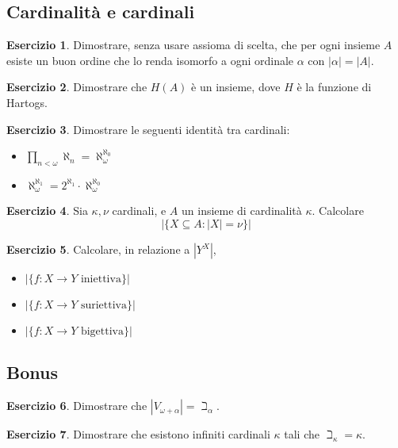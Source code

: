\documentclass[a4paper,10pt,oneside]{article}
\newcommand{\abs}[1]{\left|#1\right|}
\theoremstyle{plain}
\theoremstyle{definition}
\newtheorem{myex}{Esercizio}
\theoremstyle{remark}
\begin{document}
\subsection{Cardinalità e cardinali}
\begin{myex}
 Dimostrare, senza usare assioma di scelta, che per ogni insieme $A$ esiste un buon ordine che lo renda isomorfo a ogni ordinale $\alpha$ con $\abs\alpha=\abs A$.
\end{myex}
\begin{myex}\label{ex:Hart}
 Dimostrare che $H(A)$ è un insieme, dove $H$ è la funzione di Hartogs.
\end{myex}
\begin{myex}
 Dimostrare le seguenti identità tra cardinali:
 \begin{itemize}
  \item $\prod_{n<\omega}\aleph_n=\aleph_\omega^{\aleph_0}$
  \item $\aleph_\omega^{\aleph_1}=2^{\aleph_1}\cdot \aleph_\omega^{\aleph_0}$
 \end{itemize}
\end{myex}
\begin{myex}
 Sia $\kappa, \nu$ cardinali, e $A$ un insieme di cardinalità $\kappa$. Calcolare \[\abs{\{X\subseteq A: \abs X = \nu\}}\]
\end{myex}
\begin{myex}
 Calcolare, in relazione a $\abs{Y^X}$,
 \begin{itemize}
  \item $\abs{\{f:X\rightarrow Y \textrm{ iniettiva}\}}$
  \item $\abs{\{f:X\rightarrow Y \textrm{ suriettiva}\}}$
  \item $\abs{\{f:X\rightarrow Y \textrm{ bigettiva}\}}$
 \end{itemize}

\end{myex}

\subsection{Bonus}

\begin{myex}
 Dimostrare che $\abs{V_{\omega+\alpha}}=\beth_\alpha$.
\end{myex}

\begin{myex}
 Dimostrare che esistono infiniti cardinali $\kappa$ tali che $\beth_\kappa=\kappa$.
\end{myex}
\end{document}

